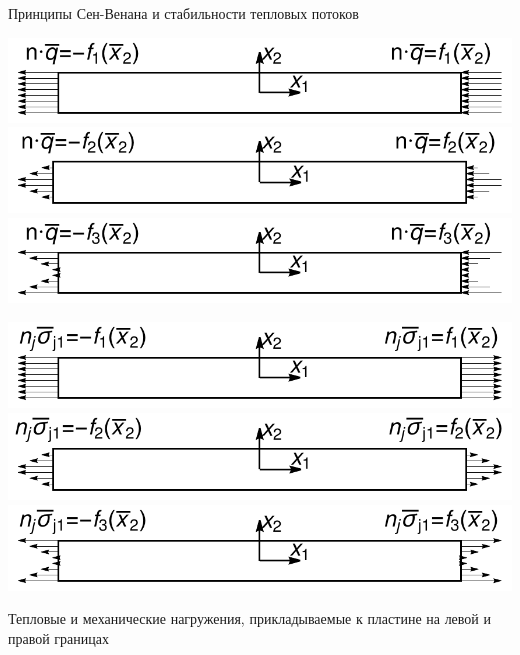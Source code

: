 \begin{frame}{Принципы Сен-Венана и стабильности тепловых потоков}
\centering
\begin{minipage}{0.49\textwidth}
	\centering
	\includegraphics[width=\textwidth]{pics/RectangleFluxF1.pdf} \\
	\includegraphics[width=\textwidth]{pics/RectangleFluxF2.pdf} \\
	\includegraphics[width=\textwidth]{pics/RectangleFluxF3.pdf} \\
\end{minipage}
\begin{minipage}{0.49\textwidth}
	\centering
	\includegraphics[width=\textwidth]{pics/RectangleStressF1.pdf} \\
	\includegraphics[width=\textwidth]{pics/RectangleStressF2.pdf} \\
	\includegraphics[width=\textwidth]{pics/RectangleStressF3.pdf} \\
\end{minipage}
Тепловые и механические нагружения, прикладываемые к пластине на левой и правой границах
\end{frame}


